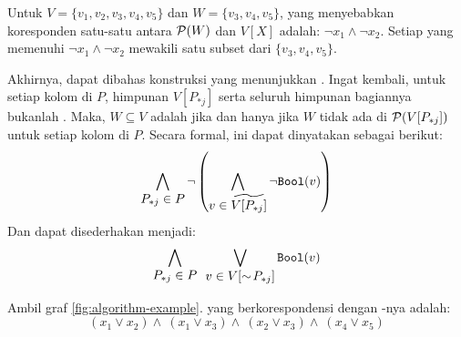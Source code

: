 \begin{example}
	Untuk \(V = \{v_1, v_2, v_3, v_4, v_5\}\) dan \(W = \{v_3, v_4, v_5\}\),  yang menyebabkan koresponden satu-satu antara \(\mathcal{P}(W)\) dan \(V[X]\) adalah: \(\neg x_1 \wedge \neg x_2\). Setiap  yang memenuhi \(\neg x_1 \wedge \neg x_2\) mewakili satu subset dari \(\{v_3, v_4, v_5\}\).
\end{example}

Akhirnya, dapat dibahas konstruksi  yang menunjukkan . Ingat kembali, untuk setiap kolom di \(P\), himpunan \(V[P_{*j}]\) serta seluruh himpunan bagiannya bukanlah . Maka, \(W \subseteq V\) adalah  jika dan hanya jika \(W\) tidak ada di \(\mathcal{P}(V[P_{*j}])\) untuk setiap kolom di \(P\). Secara formal, ini dapat dinyatakan sebagai berikut:
\[
	\bigwedge \limits_{\displaystyle P_{*j} \in P} \neg \left( \bigwedge \limits_{\displaystyle v \in \widetilde{V[P_{*j}]}} \neg \mathtt{Bool}(v) \right)
\]
Dan dapat disederhakan menjadi:
\begin{equation}
	\bigwedge \limits_{\displaystyle P_{*j} \in P} \enspace \bigvee \limits_{\displaystyle v \in V[\sim\!P_{*j}]} \mathtt{Bool}(v)
	\label{eq:boolean-satisfiability-natural}
\end{equation}

\begin{example}
	Ambil graf \autoref{fig:algorithm-example}.  yang berkorespondensi dengan -nya adalah:
		\[
			( x_1 \vee x_2 ) \wedge \ ( x_1 \vee x_3 ) \wedge \ ( x_2 \vee x_3 ) \wedge \ ( x_4 \vee x_5 )
		\]
	\label{ex:boolean-satisfiability-natural}
\end{example}

